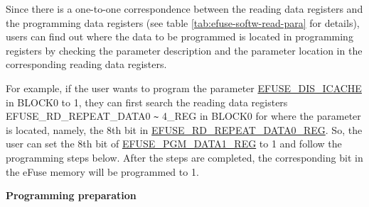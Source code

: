 \documentclass[main\_\_EN.tex]{subfiles}
\begin{document}
Since there is a one-to-one correspondence between the reading data registers and the programming data registers (see table \ref{tab:efuse-softw-read-para} for details), users can find out where the data to be programmed is located in programming registers by checking the parameter description and the parameter location in the corresponding reading data registers.

For example, if the user wants to program the parameter \hyperref[fielddesc:EFUSEDISICACHE]{EFUSE\_DIS\_ICACHE} in BLOCK0 to 1, they can first search the reading data registers EFUSE\_RD\_REPEAT\_DATA0 \verb+~+ 4\_REG in BLOCK0 for where the parameter is located, namely, the 8th bit in \hyperref[regdesc:EFUSERDREPEATDATA0REG]{EFUSE\_RD\_REPEAT\_DATA0\_REG}. So, the user can set the 8th bit of \hyperref[regdesc:EFUSEPGMDATA1REG]{EFUSE\_PGM\_DATA1\_REG}
to 1 and follow the programming steps below. After the steps are completed, the corresponding bit in the eFuse memory will be programmed to 1.

{\bfseries Programming preparation}
\end{document}

